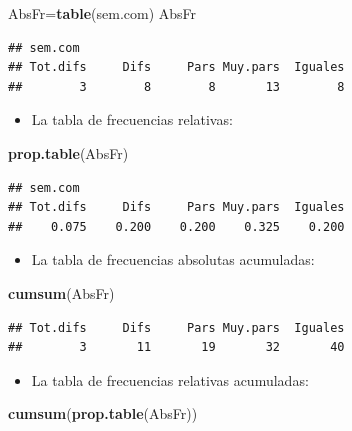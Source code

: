 \documentclass[]{book}
\newenvironment{Shaded}{\begin{snugshade}}{\end{snugshade}}
\newcommand{\KeywordTok}[1]{\textcolor[rgb]{0.13,0.29,0.53}{\textbf{#1}}}
\newcommand{\NormalTok}[1]{#1}
\providecommand{\tightlist}{%
  \setlength{\itemsep}{0pt}\setlength{\parskip}{0pt}}
\theoremstyle{definition}
\theoremstyle{definition}
\theoremstyle{definition}
\theoremstyle{remark}
\begin{document}
\begin{Shaded}
\begin{Highlighting}[]
\NormalTok{AbsFr=}\KeywordTok{table}\NormalTok{(sem.com)}
\NormalTok{AbsFr}
\end{Highlighting}
\end{Shaded}

\begin{verbatim}
## sem.com
## Tot.difs     Difs     Pars Muy.pars  Iguales 
##        3        8        8       13        8
\end{verbatim}

\begin{itemize}
\tightlist
\item
  La tabla de frecuencias relativas:
\end{itemize}

\begin{Shaded}
\begin{Highlighting}[]
\KeywordTok{prop.table}\NormalTok{(AbsFr)}
\end{Highlighting}
\end{Shaded}

\begin{verbatim}
## sem.com
## Tot.difs     Difs     Pars Muy.pars  Iguales 
##    0.075    0.200    0.200    0.325    0.200
\end{verbatim}

\begin{itemize}
\tightlist
\item
  La tabla de frecuencias absolutas acumuladas:
\end{itemize}

\begin{Shaded}
\begin{Highlighting}[]
\KeywordTok{cumsum}\NormalTok{(AbsFr)}
\end{Highlighting}
\end{Shaded}

\begin{verbatim}
## Tot.difs     Difs     Pars Muy.pars  Iguales 
##        3       11       19       32       40
\end{verbatim}

\begin{itemize}
\tightlist
\item
  La tabla de frecuencias relativas acumuladas:
\end{itemize}

\begin{Shaded}
\begin{Highlighting}[]
\KeywordTok{cumsum}\NormalTok{(}\KeywordTok{prop.table}\NormalTok{(AbsFr))}
\end{Highlighting}
\end{Shaded}
\end{document}

